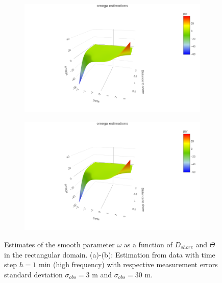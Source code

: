 \documentclass[11pt]{article}
\newcommand {\1}{\mathbb{1}}
\begin{document}
\begin{figure}[H]
	\centering
	\begin{subfigure}{0.48\textwidth}
		\centering
		\includegraphics[scale=0.3]{images/simulation study/omega_crcvm_rect_hf_ne1.png}
		\caption{}
	\end{subfigure}
	\begin{subfigure}{0.48\textwidth}
		\centering
		\includegraphics[scale=0.3]{images/simulation study/omega_crcvm_rect_hf_ne1.png}
		\caption{}
	\end{subfigure}
	\caption{Estimates of the smooth parameter $\omega$ as a function of $D_{shore}$ and $\Theta$ in the rectangular domain. (a)-(b): Estimation from data with time step $h=1$ min (high frequency) with respective measurement errors standard deviation $\sigma_{obs}=3$ m and $\sigma_{obs}=30$ m.}
	\label{fig: estimate_rect_CRCVM}
\end{figure}
\end{document}
